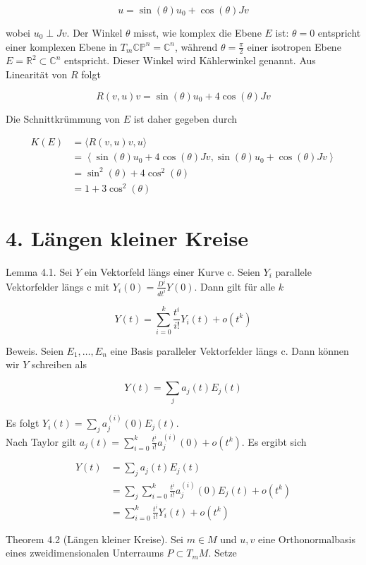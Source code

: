 \documentclass[10pt, letterpaper]{article}
\begin{document}
$$
u=\sin (\theta) u_{0}+\cos (\theta) J v
$$

wobei $u_{0} \perp J v$. Der Winkel $\theta$ misst, wie komplex die Ebene $E$ ist: $\theta=0$ entspricht einer komplexen Ebene in $T_{m} \mathbb{C P}^{n}=\mathbb{C}^{n}$, während $\theta=\frac{\pi}{2}$ einer isotropen Ebene $E=\mathbb{R}^{2} \subset \mathbb{C}^{n}$ entspricht. Dieser Winkel wird Kählerwinkel genannt. Aus Linearität von $R$ folgt

$$
R(v, u) v=\sin (\theta) u_{0}+4 \cos (\theta) J v
$$

Die Schnittkrümmung von $E$ ist daher gegeben durch

$$
\begin{aligned}
K(E) & =\langle R(v, u) v, u\rangle \\
& =\left\langle\sin (\theta) u_{0}+4 \cos (\theta) J v, \sin (\theta) u_{0}+\cos (\theta) J v\right\rangle \\
& =\sin ^{2}(\theta)+4 \cos ^{2}(\theta) \\
& =1+3 \cos ^{2}(\theta)
\end{aligned}
$$

\section*{4. Längen kleiner Kreise}
Lemma 4.1. Sei $Y$ ein Vektorfeld längs einer Kurve c. Seien $Y_{i}$ parallele Vektorfelder längs c mit $Y_{i}(0)=\frac{D^{i}}{d t^{i}} Y(0)$. Dann gilt für alle $k$

$$
Y(t)=\sum_{i=0}^{k} \frac{t^{i}}{i!} Y_{i}(t)+o\left(t^{k}\right)
$$

Beweis. Seien $E_{1}, \ldots, E_{n}$ eine Basis paralleler Vektorfelder längs c. Dann können wir $Y$ schreiben als

$$
Y(t)=\sum_{j} a_{j}(t) E_{j}(t)
$$

Es folgt $Y_{i}(t)=\sum_{j} a_{j}^{(i)}(0) E_{j}(t)$.\\
Nach Taylor gilt $a_{j}(t)=\sum_{i=0}^{k} \frac{t^{i}}{i!} a_{j}^{(i)}(0)+o\left(t^{k}\right)$. Es ergibt sich

$$
\begin{aligned}
Y(t) & =\sum_{j} a_{j}(t) E_{j}(t) \\
& =\sum_{j} \sum_{i=0}^{k} \frac{t^{i}}{i!} a_{j}^{(i)}(0) E_{j}(t)+o\left(t^{k}\right) \\
& =\sum_{i=0}^{k} \frac{t^{i}}{i!} Y_{i}(t)+o\left(t^{k}\right)
\end{aligned}
$$

Theorem 4.2 (Längen kleiner Kreise). Sei $m \in M$ und $u, v$ eine Orthonormalbasis eines zweidimensionalen Unterraums $P \subset T_{m} M$. Setze
\end{document}
